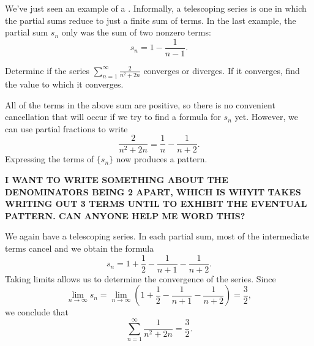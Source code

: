 \documentclass{ximera}
\begin{document}
We've just seen an example of a . Informally,
a telescoping series is one in which the partial sums reduce to just a
finite sum of terms. In the last example, the partial sum $s_n$ only was the sum of two nonzero terms: 
\[
s_n = 1 - \frac{1}{n-1}.
\]

\begin{example}
Determine if the series $\sum_{n=1}^\infty \frac{2}{n^2+2n}$ converges or diverges.  If it converges, find the value to which it converges.

\begin{explanation}
All of the terms in the above sum are positive, so there is no convenient cancellation that will occur if we try to find a formula for $s_n$ yet.  However, we can use partial fractions to write
  \[
  \frac{2}{n^2+2n} = \frac{1}{n}-\frac{1}{n+2}.
  \]  
  Expressing the terms of $\{s_n\}$ now produces a pattern.  
  \begin{image}
  \end{image}
\textbf{I WANT TO WRITE SOMETHING ABOUT THE DENOMINATORS BEING 2 APART, WHICH IS WHYIT TAKES WRITING OUT 3 TERMS UNTIL TO EXHIBIT THE EVENTUAL PATTERN.  CAN ANYONE HELP ME WORD THIS?}

We again have a telescoping series. In each partial sum, most of the intermediate 
  terms cancel and we obtain the formula
  \[
  s_n =1+\frac12-\frac1{n+1}-\frac1{n+2}.
  \]
  Taking limits allows us to determine the convergence of the series. Since
  \[
  \lim_{n\to\infty}s_n = \lim_{n\to\infty} \left(1+\frac12-\frac1{n+1}-\frac1{n+2}\right) = \frac32,
  \]
we conclude that
  \[
  \sum_{n=1}^\infty \frac1{n^2+2n} = \frac32.
  \]
\end{explanation}
\end{example}
\end{document}
